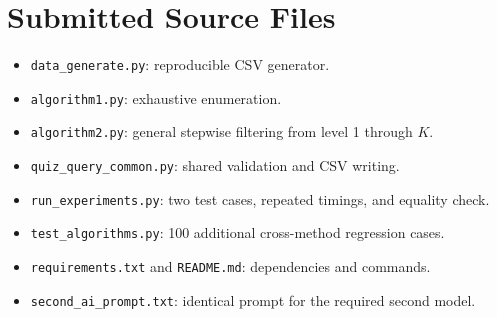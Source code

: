 \documentclass[11pt]{article}
\begin{document}
\appendix
\section{Submitted Source Files}
\small
\begin{itemize}[leftmargin=*,nosep]
  \item \texttt{data\_generate.py}: reproducible CSV generator.
  \item \texttt{algorithm1.py}: exhaustive enumeration.
  \item \texttt{algorithm2.py}: general stepwise filtering from level 1 through $K$.
  \item \texttt{quiz\_query\_common.py}: shared validation and CSV writing.
  \item \texttt{run\_experiments.py}: two test cases, repeated timings, and equality check.
  \item \texttt{test\_algorithms.py}: 100 additional cross-method regression cases.
  \item \texttt{requirements.txt} and \texttt{README.md}: dependencies and commands.
  \item \texttt{second\_ai\_prompt.txt}: identical prompt for the required second model.
\end{itemize}
\normalsize
\end{document}
